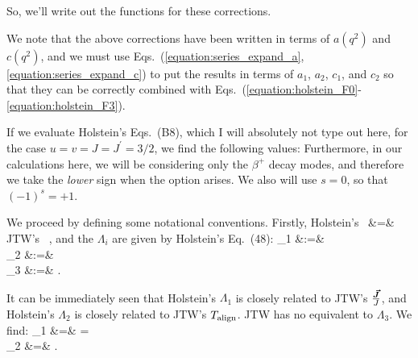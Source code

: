 
So, we'll write out the functions for these corrections.  
\unskip
\unskip
\unskip

We note that the above corrections have been written in terms of $a(q^2)$ and $c(q^2)$, and we must use Eqs.~(\ref{equation:series_expand_a}, \ref{equation:series_expand_c}) to put the results in terms of $a_1$,  $a_2$, $c_1$, and $c_2$ so that they can be correctly combined with Eqs.~(\ref{equation:holstein_F0}-\ref{equation:holstein_F3}).

If we evaluate Holstein's Eqs.~(B8), which I will absolutely not type out here, for the case $u=v=J=J^\prime=3/2$, we find the following values:
\unskip  %
Furthermore, in our calculations here, we will be considering only the $\beta^+$ decay modes, and therefore we take the \emph{lower} sign when the option arises.  We also will use $s=0$, so that $(-1)^s = +1$.



We proceed by defining some notational conventions.  Firstly, 
\bea
\textrm{Holstein's \,}  &=& \textrm{JTW's \,} ,
\label{eq:nequalsj}
\eea
and the 
$\Lambda_i$ are given by Holstein's Eq.~(48):
\bea
    \Lambda_1   &:=& \LambdaOne   
    \label{eq:lambda1} \\
    \Lambda_2   &:=& \LambdaTwo 
    \label{eq:lambda2} \\
    \Lambda_3   &:=& \LambdaThree .
    \label{eq:lambda3}
\eea

It can be immediately seen that Holstein's $\Lambda_1$ is closely related to JTW's $\frac{\bm{\vec{J}}}{J}$, and 
Holstein's $\Lambda_2$ is closely related to JTW's $T_{\mathrm{align}}$.  JTW has no equivalent to $\Lambda_3$.  We find:
\bea
\Lambda_1 \hatj &=& \LambdaOne \hatj \;\; = \;\;   \\
\Lambda_2 &=& \Talign {}.
\eea


